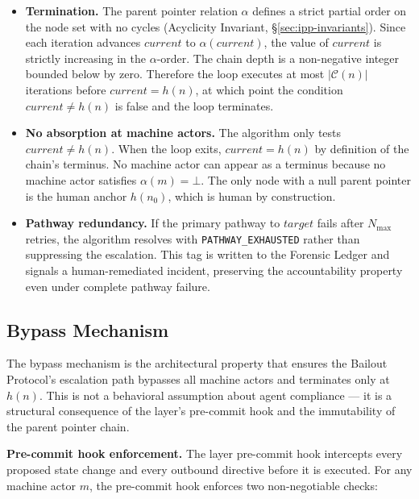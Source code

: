 \begin{itemize}
    \item \textbf{Termination.} The parent pointer relation $\alpha$ defines a strict partial order on the node set with no cycles (Acyclicity Invariant, \S\ref{sec:ipp-invariants}). Since each iteration advances $current$ to $\alpha(current)$, the value of $current$ is strictly increasing in the $\alpha$-order. The chain depth is a non-negative integer bounded below by zero. Therefore the loop executes at most $|\mathcal{C}(n)|$ iterations before $current = h(n)$, at which point the condition $current \neq h(n)$ is false and the loop terminates.

    \item \textbf{No absorption at machine actors.} The algorithm only tests $current \neq h(n)$. When the loop exits, $current = h(n)$ by definition of the chain's terminus. No machine actor can appear as a terminus because no machine actor satisfies $\alpha(m) = \bot$. The only node with a null parent pointer is the human anchor $h(n_0)$, which is human by construction.

    \item \textbf{Pathway redundancy.} If the primary pathway to $target$ fails after $N_{\max}$ retries, the algorithm resolves with \texttt{PATHWAY\_EXHAUSTED} rather than suppressing the escalation. This tag is written to the Forensic Ledger and signals a human-remediated incident, preserving the accountability property even under complete pathway failure.
\end{itemize}

\subsection{Bypass Mechanism}
\label{sec:bp-bypass}

The bypass mechanism is the architectural property that ensures the Bailout Protocol's escalation path bypasses all machine actors and terminates only at $h(n)$. This is not a behavioral assumption about agent compliance --- it is a structural consequence of the \fact{} layer's pre-commit hook and the immutability of the parent pointer chain.

\bigskip
\noindent\textbf{Pre-commit hook enforcement.} The \fact{} layer pre-commit hook intercepts every proposed state change and every outbound directive before it is executed. For any machine actor $m$, the pre-commit hook enforces two non-negotiable checks:

